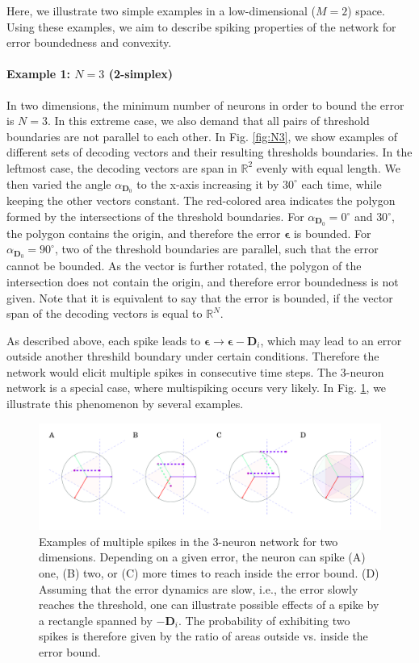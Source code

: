 \documentclass[twoside,twocolumn]{article}
\renewcommand{\b}[1]{\textbf{#1}}
\newcommand{\R}{\mathbb{R}}
\begin{document}
Here, we illustrate two simple examples in a low-dimensional ($M=2$) space. Using these examples, we aim to describe spiking properties of the network for error boundedness and convexity.

\paragraph*{Example 1: $N=3$ (2-simplex)\\}

In two dimensions, the minimum number of neurons in order to bound the error is $N=3$. In this extreme case, we also demand that all pairs of threshold boundaries are not parallel to each other. In Fig. \ref{fig:N3}, we show examples of different sets of decoding vectors and their resulting thresholds boundaries. In the leftmost case, the decoding vectors are span in $\R^2$ evenly with equal length. We then varied the angle $\alpha_{\b{D}_0}$ to the x-axis increasing it by $30^\circ$ each time, while keeping the other vectors constant. The red-colored area indicates the polygon formed by the intersections of the threshold boundaries. For $\alpha_{\b{D}_0} = 0^{\circ}$ and $30^\circ$, the polygon contains the origin, and therefore the error $\boldsymbol{\epsilon}$ is bounded. For $\alpha_{\b{D}_0} =90^{\circ}$, two of the threshold boundaries are parallel, such that the error cannot be bounded. As the vector is further rotated, the polygon of the intersection does not contain the origin, and therefore error boundedness is not given. Note that it is equivalent to say that the error is bounded, if the vector span of the decoding vectors is equal to $\R^N$. 

As described above, each spike leads to $\boldsymbol{\epsilon}\rightarrow\boldsymbol{\epsilon}-\b{D}_i$, which may lead to an error outside another threshild boundary under certain conditions. Therefore the network would elicit multiple spikes in consecutive time steps. The 3-neuron network is a special case, where multispiking occurs very likely. In Fig. \ref{fig:multispike}, we illustrate this phenomenon by several examples.    

\begin{figure}[!ht]
\centering
  \includegraphics[width=\textwidth]{../plots/doublespike.pdf}
  \caption{Examples of multiple spikes in the 3-neuron network for two dimensions. Depending on a given error, the neuron can spike (A) one, (B) two, or (C) more times to reach inside the error bound. (D) Assuming that the error dynamics are slow, i.e., the error slowly reaches the threshold, one can illustrate possible effects of a spike by a rectangle spanned by $-\b{D}_i$. The probability of exhibiting two spikes is therefore given by the ratio of areas outside vs. inside the error bound.}
  \label{fig:multispike}
\end{figure} 
 
\end{document}
